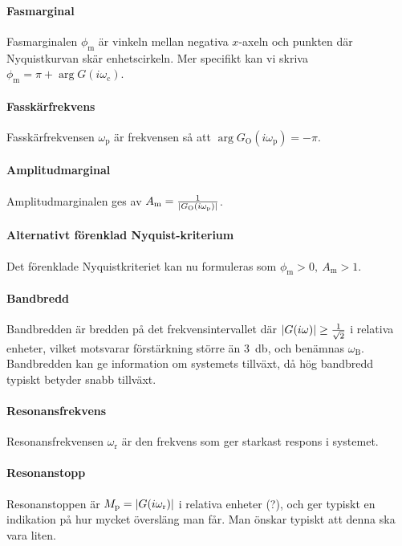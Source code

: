 \paragraph{Fasmarginal}
Fasmarginalen $\phi_{\text{m}}$ är vinkeln mellan negativa $x$-axeln och punkten där Nyquistkurvan skär enhetscirkeln. Mer specifikt kan vi skriva $\phi_{\text{m}} = \pi + \arg{G(i\omega_{\text{c}})}$.

\paragraph{Fasskärfrekvens}
Fasskärfrekvensen $\omega_{\text{p}}$ är frekvensen så att $\arg{G_{\text{O}}(i\omega_{\text{p}})} = -\pi$.

\paragraph{Amplitudmarginal}
Amplitudmarginalen ges av $A_{\text{m}} = \frac{1}{\abs{G_{\text{O}}(i\omega_{\text{p}})}}$.

\paragraph{Alternativt förenklad Nyquist-kriterium}
Det förenklade Nyquistkriteriet kan nu formuleras som $\phi_{\text{m}} > 0,\ A_{\text{m}} > 1$.

\paragraph{Bandbredd}
Bandbredden är bredden på det frekvensintervallet där $\abs{G(i\omega)} \geq \frac{1}{\sqrt{2}}$ i relativa enheter, vilket motsvarar förstärkning större än \SI{3}{\decibel}, och benämnas $\omega_{\text{B}}$. Bandbredden kan ge information om systemets tillväxt, då hög bandbredd typiskt betyder snabb tillväxt.

\paragraph{Resonansfrekvens}
Resonansfrekvensen $\omega_{\text{r}}$ är den frekvens som ger starkast respons i systemet.

\paragraph{Resonanstopp}
Resonanstoppen är $M_{\text{p}} = \abs{G(i\omega_{\text{r}})}$ i relativa enheter (?), och ger typiskt en indikation på hur mycket översläng man får. Man önskar typiskt att denna ska vara liten.

